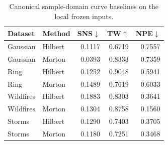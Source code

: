 \begin{table}[t]
\centering
\caption{Canonical sample-domain curve baselines on the local frozen inputs.}
\label{tab:space-filling-supplement}
\footnotesize
\setlength{\tabcolsep}{3pt}
\begin{tabular}{llrrr}
\toprule
Dataset & Method & SNS$\downarrow$ & TW$\uparrow$ & NPE$\downarrow$ \\
\midrule
Gaussian & Hilbert & 0.1117 & 0.6719 & 0.7557 \\
Gaussian & Morton & 0.0393 & 0.8333 & 0.7359 \\
Ring & Hilbert & 0.1252 & 0.9048 & 0.5941 \\
Ring & Morton & 0.1489 & 0.7619 & 0.6033 \\
Wildfires & Hilbert & 0.1883 & 0.8303 & 0.3641 \\
Wildfires & Morton & 0.1304 & 0.8758 & 0.1560 \\
Storms & Hilbert & 0.1290 & 0.7403 & 0.3705 \\
Storms & Morton & 0.1180 & 0.7251 & 0.3468 \\
\bottomrule
\end{tabular}
\end{table}
